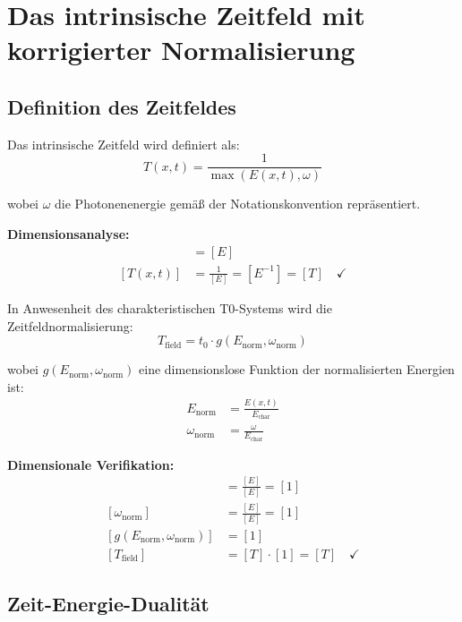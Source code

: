\documentclass[12pt,a4paper]{report}
\newcommand{\tzero}{t_0}                  %
\begin{document}
	\section{Das intrinsische Zeitfeld mit korrigierter Normalisierung}
	
	\subsection{Definition des Zeitfeldes}
	
	Das intrinsische Zeitfeld wird definiert als:
	\begin{equation}
		T(x,t) = \frac{1}{\max(E(x,t), \omega)}
		\label{eq:time_field}
	\end{equation}
	
	wobei $\omega$ die Photonenenergie gemäß der Notationskonvention repräsentiert.
	
	\textbf{Dimensionsanalyse:}
	\begin{align}
		[\max(E(x,t), \omega)] &= [E] \\
		[T(x,t)] &= \frac{1}{[E]} = [E^{-1}] = [T] \quad \checkmark
	\end{align}
	
	In Anwesenheit des charakteristischen T0-Systems wird die Zeitfeldnormalisierung:
	\begin{equation}
		\boxed{T_{\text{field}} = \tzero \cdot g(E_{\text{norm}}, \omega_{\text{norm}})}
		\label{eq:time_field_normalized}
	\end{equation}
	
	wobei $g(E_{\text{norm}}, \omega_{\text{norm}})$ eine dimensionslose Funktion der normalisierten Energien ist:
	\begin{align}
		E_{\text{norm}} &= \frac{E(x,t)}{E_{\text{char}}} \\
		\omega_{\text{norm}} &= \frac{\omega}{E_{\text{char}}}
	\end{align}
	
	\textbf{Dimensionale Verifikation:}
	\begin{align}
		[E_{\text{norm}}] &= \frac{[E]}{[E]} = [1] \\
		[\omega_{\text{norm}}] &= \frac{[E]}{[E]} = [1] \\
		[g(E_{\text{norm}}, \omega_{\text{norm}})] &= [1] \\
		[T_{\text{field}}] &= [T] \cdot [1] = [T] \quad \checkmark
	\end{align}
	
	\subsection{Zeit-Energie-Dualität}
	
\end{document}
